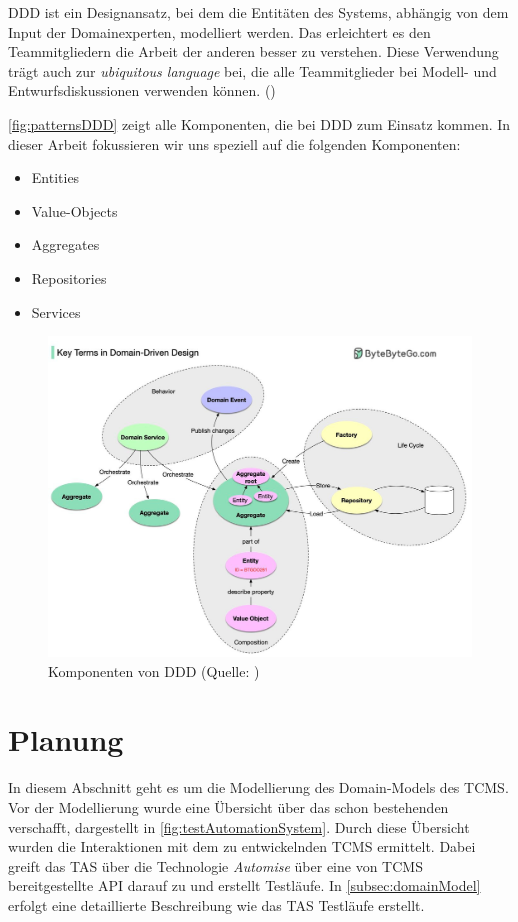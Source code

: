 \documentclass[a4paper, fontsize=11pt, parskip=half, twoside, headings=openright]{scrreprt}
\begin{document}
	\ac{DDD} ist ein Designansatz, bei dem die Entitäten des Systems, abhängig von dem Input der Domainexperten, modelliert werden.
	Das erleichtert es den Teammitgliedern die Arbeit der anderen besser zu verstehen.
	Diese Verwendung trägt auch zur \emph{ubiquitous language} bei, die alle Teammitglieder bei Modell- und Entwurfsdiskussionen verwenden können. (\textcite{vernon_implementing_2013})
	
	\autoref{fig:patternsDDD} zeigt alle Komponenten, die bei \ac{DDD} zum Einsatz kommen. 
	In dieser Arbeit fokussieren wir uns speziell auf die folgenden Komponenten:
	
	\begin{itemize}
		\setlength\itemsep{-0.5em}
		\item Entities 
		\item Value-Objects
		\item Aggregates
		\item Repositories
		\item Services
	\end{itemize}
	
	\begin{figure}[ht]
		\centering
		\includegraphics[scale=0.32]{assets/componentsDDD.jpg}
		\caption{Komponenten von \ac{DDD} (Quelle: \textcite{xu_ep32_2023})}
		\label{fig:patternsDDD}
	\end{figure}

	
	\section{Planung}
	In diesem Abschnitt geht es um die Modellierung des Domain-Models des \ac{TCMS}.
	Vor der Modellierung wurde eine Übersicht über das schon bestehenden  verschafft, dargestellt in \autoref{fig:testAutomationSystem}.
	Durch diese Übersicht wurden die Interaktionen mit dem zu entwickelnden \ac{TCMS} ermittelt.
	Dabei greift das \ac{TAS} über die Technologie \emph{Automise} über eine von \ac{TCMS} bereitgestellte \ac{API} darauf zu und erstellt Testläufe.
	In \autoref{subsec:domainModel} erfolgt eine detaillierte Beschreibung wie das \ac{TAS} Testläufe erstellt.
	
\end{document}
